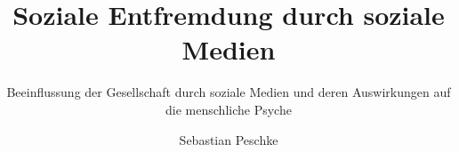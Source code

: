 \title{Soziale Entfremdung durch soziale Medien}
\subtitle{Beeinflussung der Gesellschaft durch soziale Medien und deren Auswirkungen auf die menschliche Psyche}
\author{Sebastian Peschke}
\authornote{}
\authornotemark[1]
\renewcommand{\shortauthors}{Peschke}
